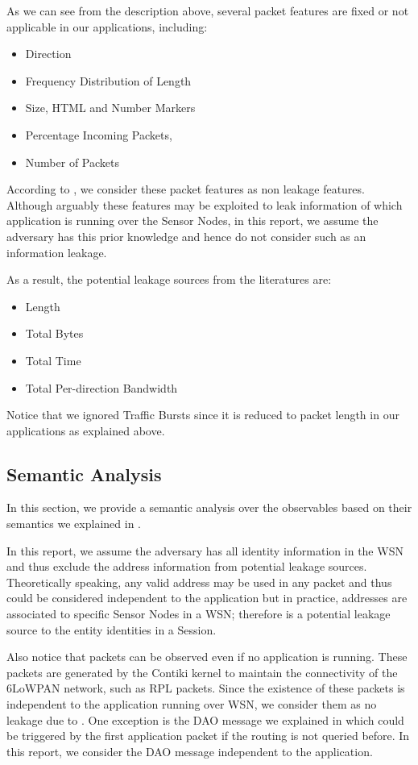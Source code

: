 As we can see from the description above, several packet features are fixed or not applicable in our applications, including:

\begin{itemize} 
	\item Direction
	\item Frequency Distribution of Length
	\item Size, HTML and Number Markers
	\item Percentage Incoming Packets,
	\item Number of Packets
\end{itemize}

According to , we consider these packet features as non leakage features. Although arguably these features may be exploited to leak information of which application is running over the Sensor Nodes, in this report, we assume the adversary has this prior knowledge and hence do not consider such as an information leakage.

As a result, the potential leakage sources from the literatures are:
\begin{itemize}
	\item Length
	\item Total Bytes
	\item Total Time
	\item Total Per-direction Bandwidth
\end{itemize}

Notice that we ignored Traffic Bursts since it is reduced to packet length in our applications as explained above.

\subsection{Semantic Analysis}

In this section, we provide a semantic analysis over the observables based on their semantics we explained in .

In this report,  we assume the adversary has all identity information in the WSN and thus exclude the address information from potential leakage sources. Theoretically speaking, any valid address may be used in any packet and thus could be considered independent to the application but in practice, addresses are associated to specific Sensor Nodes in a WSN; therefore is a potential leakage source to the entity identities in a Session. 

Also notice that packets can be observed even if no application is running. These packets  are generated by the Contiki kernel to maintain the connectivity of the 6LoWPAN network, such as RPL packets. Since the existence of these packets is independent to the application running over WSN, we consider them as no leakage due to . One exception is the DAO message we explained in  which could be triggered by the first application packet if the routing is not queried before. In this report, we consider the DAO message independent to the application.

